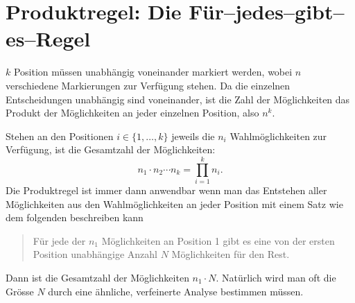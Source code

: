 \section{Produktregel: Die Für--jedes--gibt--es--Regel} \label{kombinatorik-produktregel}
$k$ Position müssen unabhängig voneinander markiert werden, wobei
$n$ verschiedene Markierungen zur Verfügung stehen.
Da die einzelnen
Entscheidungen unabhängig sind voneinander, ist die Zahl der Möglichkeiten
das Produkt der Möglichkeiten an jeder einzelnen Position, also
$n^k$.

Stehen an den Positionen $i\in\{1,\dots,k\}$ jeweils die $n_i$
Wahlmöglichkeiten
zur Verfügung, ist die Gesamtzahl der Möglichkeiten:
\[
n_1\cdot n_2\dotsm n_k=\prod_{i=1}^kn_i.
\]
Die Produktregel ist immer dann anwendbar wenn man das Entstehen
aller Möglichkeiten aus den Wahlmöglichkeiten an jeder Position
mit einem Satz wie dem folgenden beschreiben kann
\begin{quote}
Für jede der $n_1$ Möglichkeiten an Position 1 gibt es eine
von der ersten Position unabhängige
Anzahl $N$ Möglichkeiten für den Rest.
\end{quote}
Dann ist die Gesamtzahl der Möglichkeiten $n_1\cdot N$. 
Natürlich wird man oft die Grösse $N$ durch eine ähnliche,
verfeinerte Analyse bestimmen müssen.

